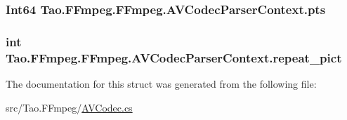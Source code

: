 \label{struct_tao_1_1_f_fmpeg_1_1_f_fmpeg_1_1_a_v_codec_parser_context_a47fe261a2fce3e3bc5c2b6df1d93dc3f}
\hypertarget{struct_tao_1_1_f_fmpeg_1_1_f_fmpeg_1_1_a_v_codec_parser_context_a1d51fec5dfbaceb6e0ddef08d5f917c0}{
\subsubsection[{pts}]{\setlength{\rightskip}{0pt plus 5cm}Int64 {\bf Tao.FFmpeg.FFmpeg.AVCodecParserContext.pts}}}
\label{struct_tao_1_1_f_fmpeg_1_1_f_fmpeg_1_1_a_v_codec_parser_context_a1d51fec5dfbaceb6e0ddef08d5f917c0}
\hypertarget{struct_tao_1_1_f_fmpeg_1_1_f_fmpeg_1_1_a_v_codec_parser_context_ab580d5e477e918c3cb7981e6159cbe0b}{
\subsubsection[{repeat\_\-pict}]{\setlength{\rightskip}{0pt plus 5cm}int {\bf Tao.FFmpeg.FFmpeg.AVCodecParserContext.repeat\_\-pict}}}
\label{struct_tao_1_1_f_fmpeg_1_1_f_fmpeg_1_1_a_v_codec_parser_context_ab580d5e477e918c3cb7981e6159cbe0b}


The documentation for this struct was generated from the following file:\begin{DoxyCompactItemize}
\item 
src/Tao.FFmpeg/\hyperlink{_a_v_codec_8cs}{AVCodec.cs}\end{DoxyCompactItemize}

